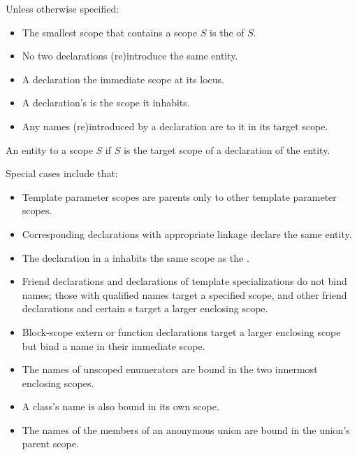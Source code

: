 \pnum
Unless otherwise specified:
\begin{itemize}
\item
The smallest scope that contains a scope $S$ is
the  of $S$.
\item
No two declarations (re)introduce the same entity.
\item
A declaration 
the immediate scope at its locus.
\item
A declaration's  is the scope it inhabits.
\item
Any names (re)introduced by a declaration are  to it
in its target scope.
\end{itemize}
An entity  to a scope $S$
if $S$ is the target scope of a declaration of the entity.
\begin{note}
Special cases include that:
\begin{itemize}
\item
Template parameter scopes are parents
only to other template parameter scopes.
\item
Corresponding declarations with appropriate linkage
declare the same entity.
\item
The declaration in a 
inhabits the same scope as the .
\item
Friend declarations and
declarations of template specializations do not bind names;
those with qualified names target a specified scope, and
other friend declarations and
certain s
target a larger enclosing scope.
\item
Block-scope extern or function declarations target a larger enclosing scope
but bind a name in their immediate scope.
\item
The names of unscoped enumerators are bound
in the two innermost enclosing scopes.
\item
A class's name is also bound in its own scope.
\item
The names of the members of an anonymous union are bound in
the union's parent scope.
\end{itemize}
\end{note}

